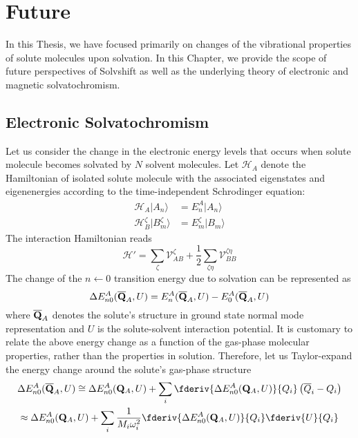 \chapter{Future}

In this Thesis, we have focused primarily on changes of the vibrational
properties of solute molecules upon solvation. In this Chapter, 
we provide the scope of future perspectives of {\sc Solvshift}
as well as the underlying theory of electronic and magnetic solvatochromism.

\section{Electronic Solvatochromism}

Let us consider the change in the electronic energy levels
that occurs when solute molecule becomes solvated by $N$
solvent molecules. Let $\mathscr{H}_A$ denote the Hamiltonian
of isolated solute molecule with the associated 
eigenstates and eigenenergies according to the time\hyp{}independent
Schr{\:o}dinger equation:
%
\begin{subequations}
\begin{align}
\mathscr{H}_A \vert A_n \rangle &=  E^A_n \vert A_n \rangle \\
\mathscr{H}_B^{\zeta} \vert B_m^{\zeta} \rangle &=  E^{\zeta}_m \vert B_m \rangle
\end{align}
\end{subequations}
%
The interaction Hamiltonian reads
%
\begin{equation}
\mathscr{H}' = \sum_{\zeta} \mathscr{V}_{AB}^{\zeta} + \frac{1}{2} \sum_{\zeta\eta} \mathscr{V}_{BB}^{\zeta\eta}
\end{equation}
%
The change of the $n\leftarrow 0$ transition energy
due to solvation can be represented as
%
\begin{equation}
\Delta E^A_{n0}({\bf \overline{Q}}_A, U) = E^A_n({\bf \overline{Q}}_A, U) - E^A_0({\bf \overline{Q}}_A, U)
\end{equation}
%
where ${\bf \overline{Q}}_A$ denotes the solute's structure
in ground state normal mode representation and 
$U$ is the solute\hyp{}solvent interaction potential.
It is customary to relate the above energy change as a function of the 
gas\hyp{}phase molecular properties, rather than the properties 
in solution. Therefore, let us Taylor\hyp{}expand the energy change
around the solute's gas\hyp{}phase structure
%
\begin{multline}
\Delta E^A_{n0}({\bf \overline{Q}}_A, U) \cong \Delta E^A_{n0}({\bf Q}_A, U) + 
\sum_i  \fderiv{\Delta E^A_{n0}({\bf Q}_A, U)}{Q_i} 
\left( \overline{Q}_i - Q_i \right) 
\\
 \approx \Delta E^A_{n0}({\bf Q}_A, U) + 
\sum_i \frac{1}{M_i\omega_i^2} \fderiv{\Delta E^A_{n0}({\bf Q}_A, U)}{Q_i} \fderiv{U}{Q_i}
\end{multline}
